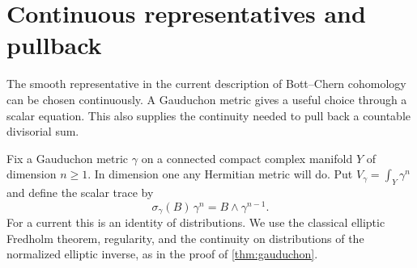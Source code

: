 \section{Continuous representatives and pullback}
\label{sec:continuous-bc-representatives}

The smooth representative in the current description of Bott--Chern cohomology can be chosen continuously. A Gauduchon metric gives a useful choice through a scalar equation. This also supplies the continuity needed to pull back a countable divisorial sum.

Fix a Gauduchon metric $\gamma$ on a connected compact complex manifold $Y$ of dimension $n\geq1$. In dimension one any Hermitian metric will do. Put $V_\gamma=\int_Y\gamma^n$ and define the scalar trace by
\[
 \sigma_\gamma(B)\,\gamma^n=B\wedge\gamma^{n-1}.
\]
For a current this is an identity of distributions. We use the classical elliptic Fredholm theorem, regularity, and the continuity on distributions of the normalized elliptic inverse, as in the proof of \cref{thm:gauduchon}.

